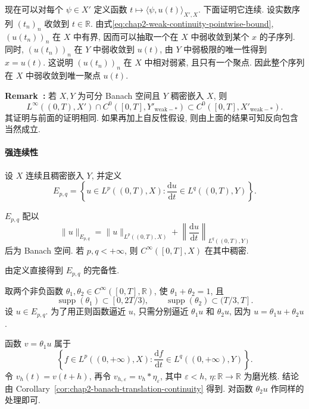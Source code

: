 \begin{Proof}
现在可以对每个 $\psi\in X'$ 定义函数 $t\mapsto\langle\psi,u(t)\rangle_{X',X}$. 下面证明它连续. 设实数序列 $(t_n)_n$ 收敛到 $t\in\mathbb{R}$. 由式\eqref{eq:chap2-weak-continuity-pointwise-bound}, $(u(t_n))_n$ 在 $X$ 中有界, 因而可以抽取一个在 $X$ 中弱收敛到某个 $x$ 的子序列. 同时, $(u(t_n))_n$ 在 $Y$ 中弱收敛到 $u(t)$, 由 $Y$ 中弱极限的唯一性得到 $x=u(t)$. 这说明 $(u(t_n))_n$ 在 $X$ 中相对弱紧, 且只有一个聚点. 因此整个序列在 $X$ 中弱收敛到唯一聚点 $u(t)$.
\end{Proof}

\par\noindent{}\textbf{Remark~\thechapterfiveremark:}\quad
\label{rem:chap2-weak-star-continuity-transfer}
若 $X,Y$ 为可分 Banach 空间且 $Y$ 稠密嵌入 $X$, 则
\[
 L^\infty((0,T),X')\cap C^0([0,T],Y'_{\mathrm{weak-*}})
 \subset C^0([0,T],X'_{\mathrm{weak-*}}).
\]
其证明与前面的证明相同. 如果再加上自反性假设, 则由上面的结果可知反向包含当然成立.
\par

\paragraph{强连续性}

设 $X$ 连续且稠密嵌入 $Y$, 并定义
\[
 E_{p,q}=\left\{u\in L^p((0,T),X):\frac{\mathrm{d}u}{\mathrm{d}t}\in L^q((0,T),Y)\right\}.
\]

\begin{Lemma}
\label{lem:chap2-epq-banach-dense-smooth}
$E_{p,q}$ 配以
\[
 \|u\|_{E_{p,q}}=\|u\|_{L^p((0,T),X)}+
 \left\|\frac{\mathrm{d}u}{\mathrm{d}t}\right\|_{L^q((0,T),Y)}
\]
后为 Banach 空间. 若 $p,q<+\infty$, 则 $C^\infty([0,T],X)$ 在其中稠密.
\end{Lemma}

\begin{Proof}
由定义直接得到 $E_{p,q}$ 的完备性.

取两个非负函数 $\theta_1,\theta_2\in C^\infty([0,T],\mathbb{R})$, 使 $\theta_1+\theta_2=1$, 且
\[
 \operatorname{supp}(\theta_1)\subset[0,2T/3),
 \qquad
 \operatorname{supp}(\theta_2)\subset(T/3,T].
\]
设 $u\in E_{p,q}$. 为了用正则函数逼近 $u$, 只需分别逼近 $\theta_1u$ 和 $\theta_2u$, 因为 $u=\theta_1u+\theta_2u$.

函数 $v=\theta_1u$ 属于
\[
 \left\{f\in L^p((0,+\infty),X):
 \frac{\mathrm{d}f}{\mathrm{d}t}\in L^q((0,+\infty),Y)\right\}.
\]
令 $v_h(t)=v(t+h)$, 再令 $v_{h,\varepsilon}=v_h*\eta_\varepsilon$, 其中 $\varepsilon<h$, $\eta:\mathbb{R}\to\mathbb{R}$ 为磨光核. 结论由 Corollary~\ref{cor:chap2-banach-translation-continuity} 得到. 对函数 $\theta_2u$ 作同样的处理即可.
\end{Proof}

